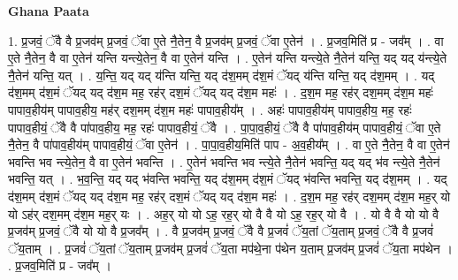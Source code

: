 \documentclass[17pt]{extarticle}
\begin{document}
\textbf{Ghana Paata } \newline

1. प्र॒जवं॒ ॅवै वै प्र॒जव॑म् प्र॒जवं॒ ॅवा ए॒ते नै॒तेन॒ वै प्र॒जव॑म् प्र॒जवं॒ ॅवा ए॒तेन॑ । . प्र॒जव॒मिति॑ प्र - जव᳚म् । . वा ए॒ते नै॒तेन॒ वै वा ए॒तेन॑ यन्ति यन्त्ये॒तेन॒ वै वा ए॒तेन॑ यन्ति । . ए॒तेन॑ यन्ति यन्त्ये॒ते नै॒तेन॑ यन्ति॒ यद् यद् य॑न्त्ये॒ते नै॒तेन॑ यन्ति॒ यत् । . य॒न्ति॒ यद् यद् य॑न्ति यन्ति॒ यद् द॑श॒मम् द॑श॒मं ॅयद् य॑न्ति यन्ति॒ यद् द॑श॒मम् । . यद् द॑श॒मम् द॑श॒मं ॅयद् यद् द॑श॒म मह॒ रह॑र् दश॒मं ॅयद् यद् द॑श॒म महः॑ । . द॒श॒म मह॒ रह॑र् दश॒मम् द॑श॒म महः॑ पापाव॒हीय॑म् पापाव॒हीय॒ मह॑र् दश॒मम् द॑श॒म महः॑ पापाव॒हीय᳚म् । . अहः॑ पापाव॒हीय॑म् पापाव॒हीय॒ मह॒ रहः॑ पापाव॒हीयं॒ ॅवै वै पा॑पाव॒हीय॒ मह॒ रहः॑ पापाव॒हीयं॒ ॅवै । . पा॒पा॒व॒हीयं॒ ॅवै वै पा॑पाव॒हीय॑म् पापाव॒हीयं॒ ॅवा ए॒ते नै॒तेन॒ वै पा॑पाव॒हीय॑म् पापाव॒हीयं॒ ॅवा ए॒तेन॑ । . पा॒पा॒व॒हीय॒मिति॑ पाप - अ॒व॒हीय᳚म् । . वा ए॒ते नै॒तेन॒ वै वा ए॒तेन॑ भवन्ति भव न्त्ये॒तेन॒ वै वा ए॒तेन॑ भवन्ति । . ए॒तेन॑ भवन्ति भव न्त्ये॒ते नै॒तेन॑ भवन्ति॒ यद् यद् भ॑व न्त्ये॒ते नै॒तेन॑ भवन्ति॒ यत् । . भ॒व॒न्ति॒ यद् यद् भ॑वन्ति भवन्ति॒ यद् द॑श॒मम् द॑श॒मं ॅयद् भ॑वन्ति भवन्ति॒ यद् द॑श॒मम् । . यद् द॑श॒मम् द॑श॒मं ॅयद् यद् द॑श॒म मह॒ रह॑र् दश॒मं ॅयद् यद् द॑श॒म महः॑ । . द॒श॒म मह॒ रह॑र् दश॒मम् द॑श॒म मह॒र् यो यो ऽह॑र् दश॒मम् द॑श॒म मह॒र् यः । . अह॒र् यो यो ऽह॒ रह॒र् यो वै वै यो ऽह॒ रह॒र् यो वै । . यो वै वै यो यो वै प्र॒जव॑म् प्र॒जवं॒ ॅवै यो यो वै प्र॒जव᳚म् । . वै प्र॒जव॑म् प्र॒जवं॒ ॅवै वै प्र॒जवं॑ ॅय॒तां ॅय॒ताम् प्र॒जवं॒ ॅवै वै प्र॒जवं॑ ॅय॒ताम् । . प्र॒जवं॑ ॅय॒तां ॅय॒ताम् प्र॒जव॑म् प्र॒जवं॑ ॅय॒ता मप॑थे॒ना प॑थेन य॒ताम् प्र॒जव॑म् प्र॒जवं॑ ॅय॒ता मप॑थेन । . प्र॒जव॒मिति॑ प्र - जव᳚म् । \newline
\end{document}
